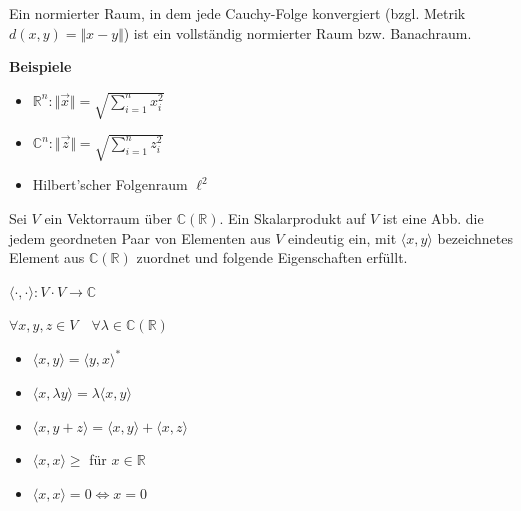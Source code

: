 \documentclass{physikprotokoll}
\begin{document}
	\begin{Def}
		Ein normierter Raum, in dem jede Cauchy-Folge konvergiert (bzgl. Metrik $d(x,y) = \Vert x-y \Vert$)
		ist ein vollständig normierter Raum bzw. Banachraum.
	\end{Def}


	\textbf{Beispiele}
	\begin{itemize}
		\item $\mathbb{R}^n: \Vert \vec x \Vert = \sqrt{\sum_{i=1}^n x_i^2}$
		\item $\mathbb{C}^n: \Vert \vec z \Vert = \sqrt{\sum_{i=1}^n z_i^2}$
		\item Hilbert'scher Folgenraum $\ell^2$
	\end{itemize}

	\begin{Def}
		Sei $V$ ein Vektorraum über $\mathbb{C} (\mathbb{R})$.
		Ein Skalarprodukt auf $V$ ist eine Abb. die jedem geordneten Paar von
		Elementen aus $V$ eindeutig ein, mit $\langle x,y\rangle$ bezeichnetes Element aus
		$\mathbb{C} (\mathbb{R})$ zuordnet und folgende Eigenschaften erfüllt.

		$\langle\cdot,\cdot \rangle: V\cdot V \rightarrow \mathbb{C}$ 
		
		$\forall x,y,z \in V \quad \forall \lambda \in \mathbb{C} (\mathbb{R})$

		\begin{itemize}
			\item $\langle x,y\rangle = \langle y,x\rangle^\ast$
			\item $\langle x,\lambda y\rangle = \lambda \langle x,y\rangle$
			\item $\langle x,y+z\rangle = \langle x,y\rangle + \langle x,z\rangle$
			\item $\langle x,x\rangle \geq$ für $ x \in \mathbb{R}$
			\item $\langle x,x\rangle = 0 \Leftrightarrow x=0$
		\end{itemize}
	\end{Def}
\end{document}
